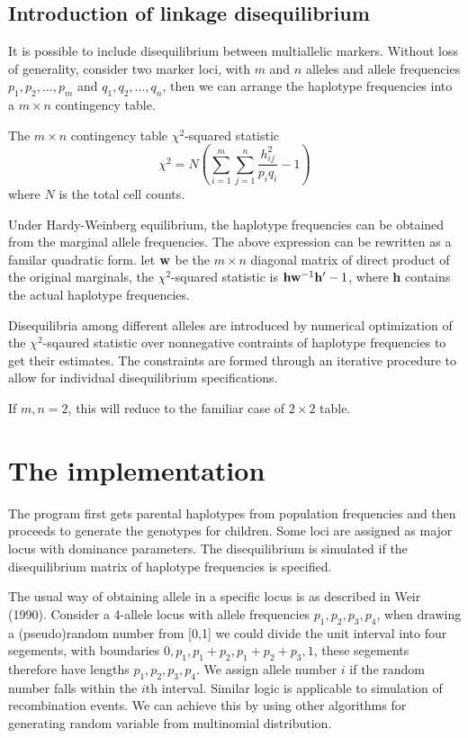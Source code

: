\documentclass[12pt]{article}
\begin{document}
\subsection{Introduction of linkage disequilibrium}

It is possible to include disequilibrium between multiallelic markers. Without loss of
generality, consider two marker loci, with $m$ and $n$ alleles and allele frequencies
$p_1,p_2,...,p_m$ and $q_1,q_2,...,q_n$, then we can arrange the haplotype
frequencies into a $m\times n$ contingency table. 

The $m\times n$ contingency table $\chi^2$-squared statistic $$\chi^2=N(
\sum_{i=1}^m\sum_{j=1}^n \frac{h_{ij}^2}{p_iq_i}-1)$$ where $N$ is the total cell counts. 

Under Hardy-Weinberg equilibrium, the haplotype frequencies can be obtained from the
marginal allele frequencies. The above expression can be rewritten as a familar quadratic
form. let ${\bf w}$ be the $m\times n$ diagonal matrix of direct product of the original
marginals, the $\chi^2$-squared statistic is ${\bf h}{\bf w}^{-1}{\bf h}'-1$, where
{\bf h} contains the actual haplotype frequencies.

Disequilibria among different alleles are introduced by numerical
optimization of the $\chi^2$-sqaured statistic over nonnegative
contraints of haplotype frequencies to get their
estimates. The constraints are formed through an iterative procedure to
allow for individual disequilibrium specifications. 

If $m,n=2$, this will reduce to the familiar case of $2\times 2$ table.


\section{The implementation}

The program first gets parental haplotypes from population frequencies and then proceeds
to generate the genotypes for children. Some loci are assigned as major
locus with dominance parameters. The disequilibrium is simulated if the disequilibrium
matrix of haplotype frequencies is specified.

The usual way of obtaining allele in a specific locus is as described in Weir (1990). 
Consider a 4-allele locus with allele frequencies $p_1, p_2, p_3, p_4$, when drawing a
(pseudo)random number from [0,1] we could divide the unit interval into four segements,
with boundaries $0, p_1, p_1+p_2, p_1+p_2+p_3, 1$, these segements therefore have lengths
$p_1, p_2, p_3, p_4$.  We assign allele number $i$ if the random number falls within the
$i$th interval.  Similar logic is applicable to simulation of recombination events. We can
achieve this by using other algorithms for generating random variable from multinomial
distribution.
\end{document}

